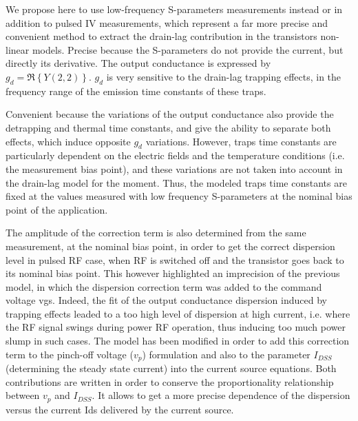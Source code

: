 \documentclass[conference]{IEEEtran}
\begin{document}
We propose here to use low-frequency S-parameters measurements instead or in addition to pulsed IV measurements, which represent a far more precise and convenient method to extract the drain-lag contribution in the transistors non-linear models. Precise because the S-parameters do not provide the current, but directly its derivative. The output conductance is expressed by $g_d=\Re \left\{Y(2,2)\right\}$. $g_d$ is very sensitive to the drain-lag trapping effects, in the frequency range of the emission time constants of these traps.

Convenient because the variations of the output conductance also provide the detrapping and thermal time constants, and give the ability to separate both effects, which induce opposite $g_d$ variations. However, traps time constants are particularly dependent on the electric fields and the temperature conditions (i.e. the measurement bias point), and these variations are not taken into account in the drain-lag model for the moment. Thus, the modeled traps time constants are fixed at the values measured with low frequency S-parameters at the nominal bias point of the application.

The amplitude of the correction term is also determined from the same measurement, at the nominal bias point, in order to get the correct dispersion level in pulsed RF case, when RF is switched off and the transistor goes back to its nominal bias point. This however highlighted an imprecision of the previous model, in which the dispersion correction term was added to the command voltage vgs. Indeed, the fit of the output conductance dispersion induced by trapping effects leaded to a too high level of dispersion at high current, i.e. where the RF signal swings during power RF operation, thus inducing too much power slump in such cases. The model has been modified in order to add this correction term to the pinch-off voltage ($v_p$) formulation and also to the parameter $I_{DSS}$ (determining the steady state current) into the current source equations. Both contributions are written in order to conserve the proportionality relationship between $v_p$ and $I_{DSS}$. It allows to get a more precise dependence of the dispersion versus the current Ids delivered by the current source.
\end{document}
